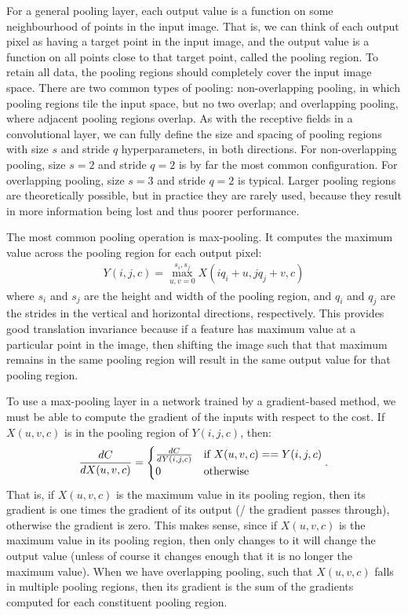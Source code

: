For a general pooling layer,
each output value is a function
on some neighbourhood of points in the input image.
That is, we can think of each output pixel as having a target point
in the input image,
and the output value is a function on all points close to that target point,
called the pooling region.
To retain all data,
the pooling regions should completely cover the input image space.
There are two common types of pooling:
non-overlapping pooling, in which pooling regions tile the input space,
but no two overlap;
and overlapping pooling, where adjacent pooling regions overlap.
As with the receptive fields in a convolutional layer,
we can fully define the size and spacing of pooling regions
with size $s$ and stride $q$ hyperparameters, in both directions.
For non-overlapping pooling, size $s = 2$ and stride $q = 2$ is by far
the most common configuration.
For overlapping pooling, size $s = 3$ and stride $q = 2$ is typical.
Larger pooling regions are theoretically possible,
but in practice they are rarely used,
because they result in more information being lost
and thus poorer performance.

The most common pooling operation is max-pooling.
It computes the maximum value across the pooling region for each output pixel:
\begin{align}
  Y(i,j,c) = \max_{u,v=0}^{s_i,s_j} X(i q_i + u, j q_j + v, c)
\end{align}
where $s_i$ and $s_j$ are the height and width of the pooling region,
and $q_i$ and $q_j$ are the strides in the vertical and horizontal directions,
respectively.
This provides good translation invariance
because if a feature has maximum value at a particular point in the image,
then shifting the image such that that maximum remains in the same pooling region
will result in the same output value for that pooling region.

To use a max-pooling layer in a network trained by a gradient-based method,
we must be able to compute the gradient of the inputs with respect to the cost.
If $X(u,v,c)$ is in the pooling region of $Y(i,j,c)$, then:
\begin{align}
  \frac{dC}{dX(u,v,c)} = \begin{cases}
    \frac{dC}{dY(i,j,c)} & \text{if } X(u,v,c) == Y(i,j,c) \\
    0 & \text{otherwise}
  \end{cases}.
\end{align}
That is, if $X(u,v,c)$ is the maximum value in its pooling region,
then its gradient is one times the gradient of its output
(\ie/ the gradient passes through),
otherwise the gradient is zero.
This makes sense, since if $X(u,v,c)$ is the maximum value in its pooling region,
then only changes to it will change the output value
(unless of course it changes enough that it is no longer the maximum value).
When we have overlapping pooling, such that $X(u,v,c)$ falls in multiple pooling regions,
then its gradient is the sum of the gradients computed for each constituent pooling region.

